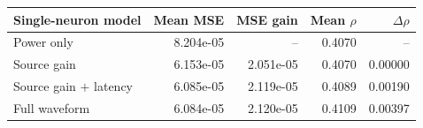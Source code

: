\begin{tabular}{@{}lrrrr@{}}
\toprule
Single-neuron model & Mean MSE & MSE gain & Mean $\rho$ & $\Delta\rho$ \\
\midrule
Power only & 8.204e-05 & -- & 0.4070 & -- \\
Source gain & 6.153e-05 & 2.051e-05 & 0.4070 & 0.00000 \\
Source gain $+$ latency & 6.085e-05 & 2.119e-05 & 0.4089 & 0.00190 \\
Full waveform & 6.084e-05 & 2.120e-05 & 0.4109 & 0.00397 \\
\bottomrule
\end{tabular}
